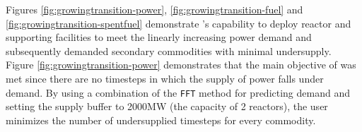     \begin{table}[]
        \end{table}

Figures \ref{fig:growingtransition-power}, \ref{fig:growingtransition-fuel}
and \ref{fig:growingtransition-spentfuel} demonstrate \deploy's capability 
to deploy reactor and supporting facilities to meet the linearly increasing
power demand and subsequently demanded secondary commodities with 
minimal undersupply.
Figure \ref{fig:growingtransition-power} demonstrates that
the main objective of \deploy was met since there are no timesteps
in which the supply of power falls under demand.
By using a combination of the \texttt{FFT} method for 
predicting demand and setting the supply buffer to 2000MW 
(the capacity of 2 reactors), the user minimizes the number of 
undersupplied timesteps for every commodity.

